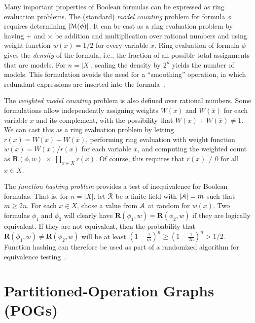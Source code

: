 \documentclass[letterpaper,USenglish,cleveref, autoref, thm-restate]{lipics-v2021}
\newcommand{\obar}[1]{\overline{#1}}
\newcommand{\varset}{X}
\newcommand{\ring}{{\cal R}}
\newcommand{\dset}{{\cal A}}
\newcommand{\rep}{\textbf{R}}
\newcommand{\radd}{+}
\newcommand{\rmul}{\times}
\newcommand{\modelset}{{\cal M}}
\begin{document}
Many important properties of Boolean formulas can be
expressed as ring evaluation problems.  The
(standard) {\em model counting} problem for formula $\phi$ requires determining $|\modelset(\phi)|$.
It can be cast as a ring evaluation problem by having $\radd$ and
$\rmul$ be addition and multiplication over rational numbers and using
weight function $w(x) = 1/2$ for every variable $x$.
Ring evaluation of formula $\phi$ gives the {\em density} of
the formula, i.e., the fraction of all possible total assignments that are
models.  For $n = |\varset|$, scaling the density by $2^n$
yields the number of models.  This formulation avoids the need for a ``smoothing'' operation,
in which redundant expressions are inserted into the formula~\cite{darwiche:jair:2002}.

The {\em weighted model counting}  problem is also defined over
rational numbers.  Some formulations  allow
independently assigning weights $W(x)$ and $W(\obar{x})$ for each variable $x$ and its complement, with the possibility that
$W(x) + W(\obar{x}) \not = 1$.
We can cast this as a
ring evaluation problem by letting $r(x) = W(x) + W(\obar{x})$,
performing ring evaluation with weight function $w(x) = W(x)/r(x)$ for each
variable $x$, and computing the weighted count
as $\rep(\phi, w)\; \rmul\; \prod_{x \in \varset} r(x)$.
Of course, this requires that $r(x) \not = 0$ for all $x \in \varset$.

The {\em function hashing problem} provides a test
of inequivalence for Boolean formulas.  That is, for $n = |\varset|$, let $\ring$ be a
finite  field with $|\dset| = m$ such that $m \geq 2 n$.  For each $x \in \varset$, chose a value from $\dset$ at random for $w(x)$.  Two formulas
$\phi_1$ and $\phi_2$ will clearly have $\rep(\phi_1, w) = \rep(\phi_2, w)$
if they are logically equivalent.
If they are not equivalent, then
the probability that $\rep(\phi_1, w) \not = \rep(\phi_2, w)$ will be at
least $\left(1-\frac{1}{m}\right)^n \geq \left(1-\frac{1}{2n}\right)^n > 1/2$.
Function hashing can therefore be used as part of a
randomized algorithm for equivalence testing~\cite{blum:ipl:1980}.


\section{Partitioned-Operation Graphs (POGs)}
\label{sect:pog}
\end{document}
